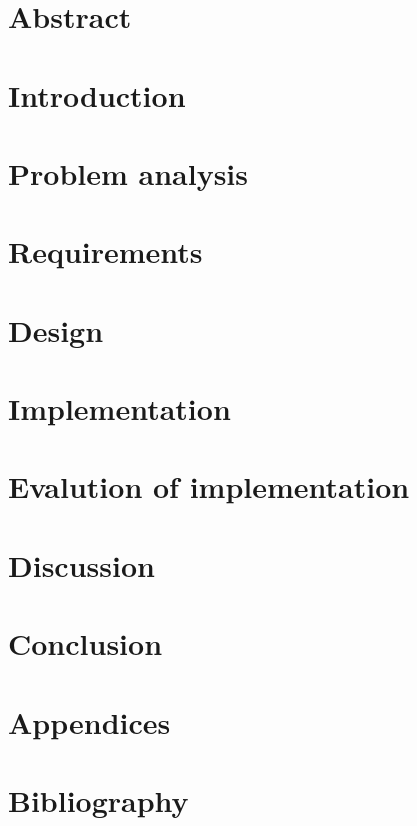 \documentclass{article}
\begin{document}

\clearpage

\section*{Abstract}

\clearpage

\tableofcontents
\clearpage

\section{Introduction}

\clearpage

\section{Problem analysis}

\clearpage

\section{Requirements}

\clearpage

\section{Design}

\clearpage

\section{Implementation}

\clearpage

\section{Evalution of implementation}

\clearpage

\section{Discussion}

\clearpage

\section{Conclusion}

\clearpage

\section{Appendices}

\clearpage

\section{Bibliography}

\end{document}
